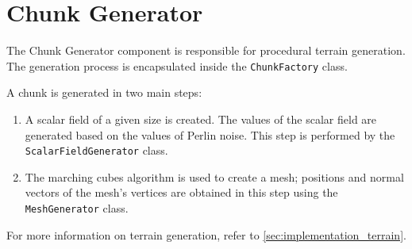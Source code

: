 \section{Chunk Generator} \label{chunk_generator}
The Chunk Generator component is responsible for procedural terrain generation.
The generation process is encapsulated inside the \texttt{ChunkFactory} class.

A chunk is generated in two main steps:
\begin{enumerate}
    \item A scalar field of a given size is created.
          The values of the scalar field are generated based on the values of Perlin noise.
          This step is performed by the \texttt{ScalarFieldGenerator} class.
    \item The marching cubes algorithm is used to create a mesh;
          positions and normal vectors of the mesh's vertices are obtained in this step using the \texttt{MeshGenerator} class.
\end{enumerate}
For more information on terrain generation, refer to \autoref{sec:implementation_terrain}.